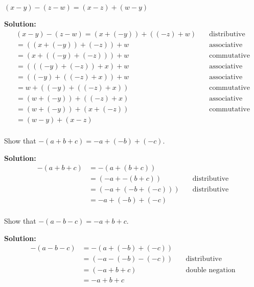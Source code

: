 \begin{tcolorbox}[title=Problem 10, breakable]
$(x - y) - (z - w) = (x - z) + (w - y)$
\end{tcolorbox}

\textbf{Solution:}
\begin{align*}
(x - y) - (z - w)  = (x + (-y)) + ((-z) + w) & \quad \text{distributive} \\
=((x + (-y)) + (-z)) + w & \quad \text{associative} \\
=(x + ((-y) + (-z))) + w  & \quad \text{commutative} \\
=(((-y) + (-z)) + x) + w & \quad \text{associative} \\
=((-y) + ((-z) + x)) + w & \quad \text{associative} \\
=w + ((-y) + ((-z) + x)) & \quad \text{commutative} \\
=(w + (-y)) + ((-z) + x) & \quad \text{associative} \\
=(w + (-y)) + (x + (-z)) & \quad \text{commutative} \\
=(w - y) + (x - z) & \quad \text{} \\
\end{align*}


\begin{tcolorbox}[title=Problem 11, breakable]
Show that $-(a + b + c) = -a + (-b) + (-c)$.
\end{tcolorbox}

\textbf{Solution:}
\begin{align*}
-(a + b + c) &= -(a + (b + c)) & \quad \text{} \\
&= (-a + -(b + c)) & \quad \text{distributive} \\
&= (-a + (-b + (-c))) & \quad \text{distributive} \\
&= -a + (-b) + (-c) & \quad \text{} \\
\end{align*}

\begin{tcolorbox}[title=Problem 12, breakable]
Show that $-(a - b - c) = -a + b + c$.
\end{tcolorbox}

\textbf{Solution:}
\begin{align*}
-(a - b - c) &= -(a + (-b) + (-c)) & \quad \text{} \\
&= (-a - (-b) - (-c)) & \quad \text{distributive} \\
&= (-a + b + c) & \quad \text{double negation} \\
&= -a + b + c & \quad \text{} \\
\end{align*}

